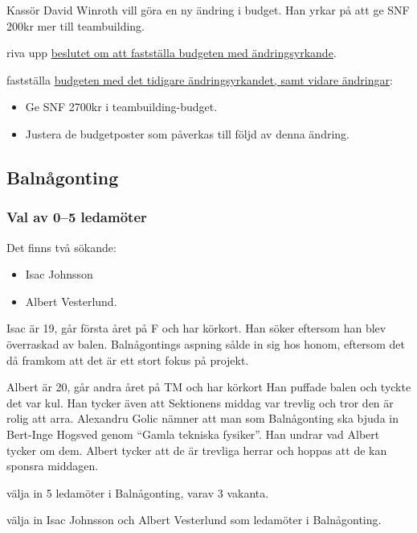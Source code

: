 \documentclass[hidelinks]{../sektionsmote} %
\begin{document}
\begin{ofraga} \label{uppriven-budget}
    Kassör David Winroth vill göra en ny ändring i budget.
    Han yrkar på att ge SNF 200kr mer till teambuilding.
    \begin{beslut}
        \item riva upp \hyperref[budget-orginalbeslut]{beslutet om att fastställa budgeten med ändringsyrkande}.
        \item fastställa \hyperlink{bilagor/styret/ny-budget2.pdf.1}{budgeten med det tidigare ändringsyrkandet, samt vidare ändringar}:
        \begin{itemize}
            \item Ge SNF 2700kr i teambuilding-budget.
            \item Justera de budgetposter som påverkas till följd av denna ändring.
        \end{itemize}
    \end{beslut}
\end{ofraga}

\subsection{Balnågonting}

\subsubsection{Val av 0--5 ledamöter}
Det finns två sökande:
\begin{itemize}
    \item Isac Johnsson
    \item Albert Vesterlund.
\end{itemize}

Isac är 19, går första året på F och har körkort.
Han söker eftersom han blev överraskad av balen.
Balnågontings aspning sålde in sig hos honom, eftersom det då framkom att det är ett stort fokus på projekt.

Albert är 20, går andra året på TM och har körkort
Han puffade balen och tyckte det var kul.
Han tycker även att Sektionens middag var trevlig och tror den är rolig att arra.
Alexandru Golic nämner att man som Balnågonting ska bjuda in Bert-Inge Hogsved genom \enquote{Gamla tekniska fysiker}.
Han undrar vad Albert tycker om dem.
Albert tycker att de är trevliga herrar och hoppas att de kan sponsra middagen.
\begin{beslut}
    \item välja in 5 ledamöter i Balnågonting, varav 3 vakanta.
    \item välja in Isac Johnsson och Albert Vesterlund som ledamöter i Balnågonting.
\end{beslut}
\end{document}
